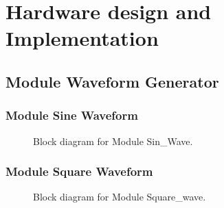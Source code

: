 \section{Hardware design and Implementation}

\subsection{Module Waveform Generator}

\subsubsection{Module Sine Waveform}
\begin{figure}[H]
	\centering
	\caption{Block diagram for Module Sin\_Wave.}
\end{figure}

\subsubsection{Module Square Waveform}
\begin{figure}[H]
	\centering
	\caption{Block diagram for Module Square\_wave.}
\end{figure}

